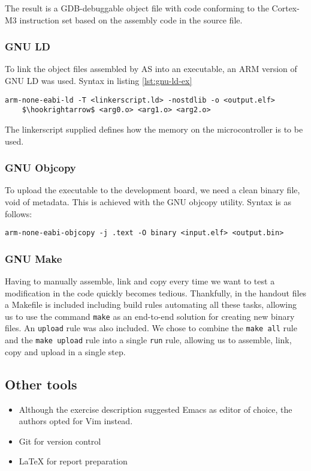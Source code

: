 The result is a GDB-debuggable object file with code conforming to the Cortex-M3 instruction set based on the assembly code in the source file.

\subsubsection{GNU LD}

To link the object files assembled by AS into an executable, an ARM version of GNU LD was used. Syntax in listing \ref{lst:gnu-ld-ex}

\begin{lstlisting}[label=lst:gnu-ld-ex,caption=Linker usage, mathescape]
arm-none-eabi-ld -T <linkerscript.ld> -nostdlib -o <output.elf>
    $\hookrightarrow$ <arg0.o> <arg1.o> <arg2.o>
\end{lstlisting}

The linkerscript supplied defines how the memory on the microcontroller is to be used.

\subsubsection{GNU Objcopy}

To upload the executable to the development board, we need a clean binary file, void of metadata. This is achieved with the GNU objcopy utility. Syntax is as follows:

\begin{lstlisting}[label=lst:gnu-objcopy-ex,caption=Objcopy usage]
arm-none-eabi-objcopy -j .text -O binary <input.elf> <output.bin>
\end{lstlisting}


\subsubsection{GNU Make}

Having to manually assemble, link and copy every time we want to test a modification in the code quickly becomes tedious. Thankfully, in the handout files a Makefile is included including build rules automating all these tasks, allowing us to use the command \texttt{make} as an end-to-end solution for creating new binary files. An \texttt{upload} rule was also included. We chose to combine the \texttt{make all} rule and the \texttt{make upload} rule into a single \texttt{run} rule, allowing us to assemble, link, copy and upload in a single step.

\subsection{Other tools}

\begin{itemize}
\item Although the exercise description suggested Emacs as editor of choice, the authors opted for Vim instead.
\item Git for version control
\item \LaTeX{} for report preparation
\end{itemize}
